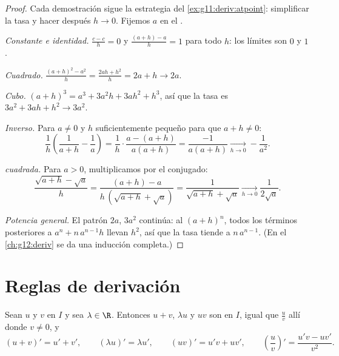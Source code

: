 \begin{proof}
Cada demostración sigue la estrategia del \cref{ex:g11:deriv:atpoint}:
simplificar la tasa y hacer después $h \to 0$. Fijemos $a$ en el .

\emph{Constante e identidad.} $\frac{c - c}{h} = 0$ y
$\frac{(a+h) - a}{h} = 1$ para todo $h$: los límites son $0$ y $1$.

\emph{Cuadrado.} $\frac{(a+h)^2 - a^2}{h} = \frac{2ah + h^2}{h} = 2a + h
\to 2a$.

\emph{Cubo.} $(a+h)^3 = a^3 + 3a^2h + 3ah^2 + h^3$, así que la tasa es
$3a^2 + 3ah + h^2 \to 3a^2$.

\emph{Inverso.} Para $a \neq 0$ y $h$ suficientemente pequeño para que
$a + h \neq 0$:
\[
\frac{1}{h}\left(\frac{1}{a+h} - \frac{1}{a}\right)
= \frac{1}{h} \cdot \frac{a - (a+h)}{a(a+h)}
= \frac{-1}{a(a+h)}
\xrightarrow[h \to 0]{} -\frac{1}{a^2}.
\]

\emph{ cuadrada.} Para $a > 0$, multiplicamos por el conjugado:
\[
\frac{\sqrt{a+h} - \sqrt a}{h}
= \frac{(a + h) - a}{h\,(\sqrt{a+h} + \sqrt a)}
= \frac{1}{\sqrt{a+h} + \sqrt a}
\xrightarrow[h \to 0]{} \frac{1}{2\sqrt a}.
\]

\emph{Potencia general.} El patrón $2a$, $3a^2$ continúa: al 
$(a+h)^n$, todos los términos posteriores a $a^n + n\,a^{n-1}h$ llevan
$h^2$, así que la tasa tiende a $n\,a^{n-1}$. (En el \cref{ch:g12:deriv}
se da una inducción completa.)
\end{proof}

\section{Reglas de derivación}

\begin{theorem}[Operaciones]\label{thm:g11:deriv:rules}
Sean $u$ y $v$  en $I$ y sea $\lambda \in \R$. Entonces
$u + v$, $\lambda u$ y $uv$ son  en $I$, igual que
$\frac{u}{v}$ allí donde $v \neq 0$, y
\[
(u+v)' = u' + v', \qquad
(\lambda u)' = \lambda u', \qquad
(uv)' = u'v + uv', \qquad
\left(\frac{u}{v}\right)' = \frac{u'v - uv'}{v^2}.
\]
\end{theorem}

